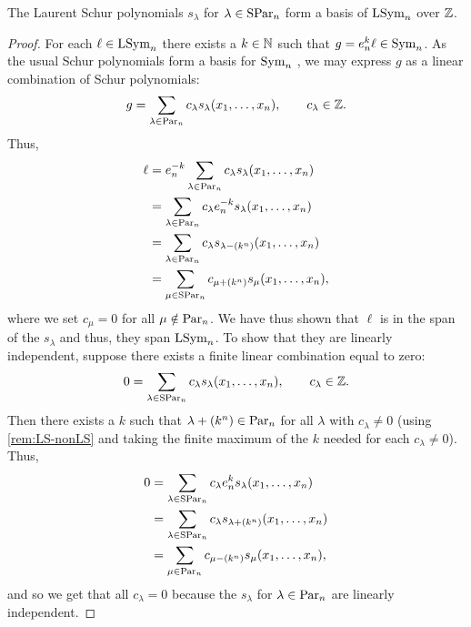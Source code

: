 \documentclass[11pt]{amsart}
\begin{document}
\begin{theo}
    The Laurent Schur polynomials $s_\lambda$ for $\lambda \in \mathrm{SPar}_n$ form a basis of $\mathrm{LSym}_n$ over $\mathbb{Z}$. \label{theo:Schur-basis}
\end{theo}

\begin{proof}
    For each $\ell \in \mathrm{LSym}_n$ there exists a $k \in \mathbb{N}$ such that $g = e_n^{k} \ell \in \mathrm{Sym}_n$. As the usual Schur polynomials form a basis for $\mathrm{Sym}_n$ \cite[Ch.~I, \S~3, Eq.~(3.2)]{Mac15}, we may express $g$ as a linear combination of Schur polynomials:
    \begin{align*}
        g = \sum_{\lambda \in \mathrm{Par}_n} c_\lambda s_\lambda(x_1, \ldots , x_n),\qquad
        c_\lambda \in \mathbb{Z}.
    \end{align*}
    Thus,
    \begin{align*}
        \ell &= e_n^{-k}  \sum_{\lambda \in \mathrm{Par}_n} c_\lambda s_\lambda(x_1, \ldots , x_n) \\
        &=  \sum_{\lambda \in \mathrm{Par}_n} c_\lambda  e_n^{-k} s_\lambda (x_1, \ldots , x_n) \\
        &= \sum_{\lambda \in \mathrm{Par}_n} c_\lambda s_{\lambda - (k^n)} (x_1, \ldots, x_n) \\
        &= \sum_{\mu \in \mathrm{SPar}_n} c_{\mu+(k^n)} s_{\mu} (x_1, \ldots, x_n),
    \end{align*}
    where we set $c_\mu = 0 $ for all $\mu \notin \mathrm{Par}_n$. We have thus shown that $\ell$ is in the span of the $s_\lambda$ and thus, they span $\mathrm{LSym}_n$.
    To show that they are linearly independent, suppose there exists a finite linear combination equal to zero:
    \begin{align*}
        0 = \sum_{\lambda \in \mathrm{SPar}_n} c_\lambda s_\lambda(x_1, \ldots ,x_n),\qquad
        c_\lambda \in \mathbb{Z}.
    \end{align*}
    Then there exists a $k$ such that $\lambda + (k^n) \in \mathrm{Par}_n$ for all $\lambda$ with $c_\lambda \neq 0$ (using \cref{rem:LS-nonLS} and taking the finite maximum of the \(k\) needed for each \(c_\lambda \neq 0\)). Thus, 
    \begin{align*}
        0 &= \sum_{\lambda \in \mathrm{SPar}_n} c_\lambda e_n ^k s_\lambda(x_1, \ldots ,x_n)  \\
        &= \sum_{\lambda \in \mathrm{SPar}_n } c_\lambda s_{\lambda + (k^n)} (x_1, \ldots ,x_n) \\
        &= \sum_{\mu \in \mathrm{Par}_n} c_{\mu - (k^n)} s_\mu(x_1, \ldots , x_n),
    \end{align*}
    and so we get that all $c_\lambda = 0$ because the $s_\lambda$ for $\lambda \in \mathrm{Par}_n$ are linearly independent.
\end{proof} 
\end{document}
